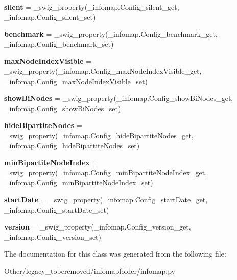 \begin{DoxyCompactItemize}
\item 
\mbox{\label{classinfomapfolder_1_1infomap_1_1Config_a2881bcbbf497d48cebc13b30dbe26995}} 
{\bfseries silent} = \+\_\+swig\+\_\+property(\+\_\+infomap.\+Config\+\_\+silent\+\_\+get, \+\_\+infomap.\+Config\+\_\+silent\+\_\+set)
\item 
\mbox{\label{classinfomapfolder_1_1infomap_1_1Config_a941a04a5f833c305d3c183404626caaa}} 
{\bfseries benchmark} = \+\_\+swig\+\_\+property(\+\_\+infomap.\+Config\+\_\+benchmark\+\_\+get, \+\_\+infomap.\+Config\+\_\+benchmark\+\_\+set)
\item 
\mbox{\label{classinfomapfolder_1_1infomap_1_1Config_a5591e5f3d04d3206dc26a4a6cff57c61}} 
{\bfseries max\+Node\+Index\+Visible} = \+\_\+swig\+\_\+property(\+\_\+infomap.\+Config\+\_\+max\+Node\+Index\+Visible\+\_\+get, \+\_\+infomap.\+Config\+\_\+max\+Node\+Index\+Visible\+\_\+set)
\item 
\mbox{\label{classinfomapfolder_1_1infomap_1_1Config_aba1779d4001e4478d2bbb8bfe5aea635}} 
{\bfseries show\+Bi\+Nodes} = \+\_\+swig\+\_\+property(\+\_\+infomap.\+Config\+\_\+show\+Bi\+Nodes\+\_\+get, \+\_\+infomap.\+Config\+\_\+show\+Bi\+Nodes\+\_\+set)
\item 
\mbox{\label{classinfomapfolder_1_1infomap_1_1Config_a6af0a5955659bed0065a2020b5d18d78}} 
{\bfseries hide\+Bipartite\+Nodes} = \+\_\+swig\+\_\+property(\+\_\+infomap.\+Config\+\_\+hide\+Bipartite\+Nodes\+\_\+get, \+\_\+infomap.\+Config\+\_\+hide\+Bipartite\+Nodes\+\_\+set)
\item 
\mbox{\label{classinfomapfolder_1_1infomap_1_1Config_afbf0b7acfd4520b3bccb7406805813ce}} 
{\bfseries min\+Bipartite\+Node\+Index} = \+\_\+swig\+\_\+property(\+\_\+infomap.\+Config\+\_\+min\+Bipartite\+Node\+Index\+\_\+get, \+\_\+infomap.\+Config\+\_\+min\+Bipartite\+Node\+Index\+\_\+set)
\item 
\mbox{\label{classinfomapfolder_1_1infomap_1_1Config_a57bebf65da79ea585fe19aa84caa3bf1}} 
{\bfseries start\+Date} = \+\_\+swig\+\_\+property(\+\_\+infomap.\+Config\+\_\+start\+Date\+\_\+get, \+\_\+infomap.\+Config\+\_\+start\+Date\+\_\+set)
\item 
\mbox{\label{classinfomapfolder_1_1infomap_1_1Config_aec78e23e953459f3bb02a561a8640ca4}} 
{\bfseries version} = \+\_\+swig\+\_\+property(\+\_\+infomap.\+Config\+\_\+version\+\_\+get, \+\_\+infomap.\+Config\+\_\+version\+\_\+set)
\end{DoxyCompactItemize}


The documentation for this class was generated from the following file\+:\begin{DoxyCompactItemize}
\item 
Other/legacy\+\_\+toberemoved/infomapfolder/infomap.\+py\end{DoxyCompactItemize}
